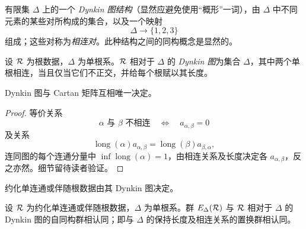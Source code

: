 \begin{definition}\label{sga3:XXI:7.4.1}
有限集 \(\Delta\) 上的一个 \emph{Dynkin 图结构}（显然应避免使用“概形”一词），由 \(\Delta\) 中不同元素的某些对所构成的集合，以及一个映射
\[
 \Delta\longrightarrow\{1,2,3\}
\]
组成；这些对称为\emph{相连对}。此种结构之间的同构概念是显然的。
\end{definition}

\begin{definition}\label{sga3:XXI:7.4.2}
设 \(\mathcal{R}\) 为根数据，\(\Delta\) 为单根系。\(\mathcal{R}\) 相对于 \(\Delta\) 的 \emph{Dynkin 图}为集合 \(\Delta\)，其中两个单根相连，当且仅当它们不正交，并给每个根赋以其长度。
\end{definition}

\begin{proposition}\label{sga3:XXI:7.4.3}
Dynkin 图与 Cartan 矩阵互相唯一决定。
\end{proposition}

\begin{proof}
等价关系
\[
 \alpha\text{ 与 }\beta\text{ 不相连}
 \quad\Longleftrightarrow\quad
 a_{\alpha,\beta}=0
\]
及关系
\[
 \operatorname{long}(\alpha)a_{\alpha,\beta}
 =
 \operatorname{long}(\beta)a_{\beta,\alpha},
\]
连同图的每个连通分量中 \(\inf\operatorname{long}(\alpha)=1\)，由相连关系及长度决定各 \(a_{\alpha,\beta}\)，反之亦然。细节留待读者验证。
\end{proof}

\begin{corollary}\label{sga3:XXI:7.4.4}
约化单连通或伴随根数据由其 Dynkin 图决定。
\end{corollary}

\begin{corollary}\label{sga3:XXI:7.4.5}
设 \(\mathcal{R}\) 为约化单连通或伴随根数据，\(\Delta\) 为单根系。群 \(E_\Delta(\mathcal{R})\) 与 \(\mathcal{R}\) 相对于 \(\Delta\) 的 Dynkin 图的自同构群相认同；即与 \(\Delta\) 的保持长度及相连关系的置换群相认同。
\end{corollary}

